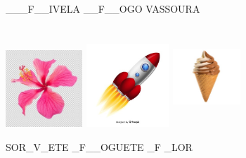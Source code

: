 \_\_\_F\_\_IVELA \_\_F\_\_OGO VASSOURA

\includegraphics[width=1.13542in,height=1.13542in]{media/image13.jpeg}
\includegraphics[width=1.24653in,height=1.22917in]{media/image14.jpeg}
\includegraphics[width=1.00000in,height=1.49583in]{media/image15.jpeg}

SOR\_V\_ETE \_F\_\_OGUETE \_F \_LOR


